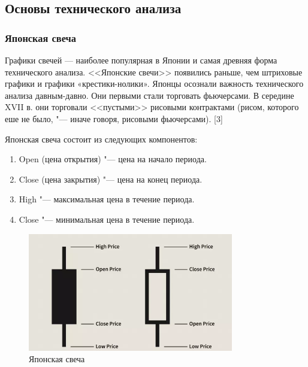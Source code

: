 \documentclass[bachelor, och, coursework]{SCWorks}
\begin{document}
        \subsection{Основы технического анализа}

            \subsubsection{Японская свеча}

            Графики свечей — наиболее популярная в Японии и самая древняя форма
            технического анализа. <<Японские свечи>> появились раньше, чем
            штриховые графики и графики «крестики-нолики». Японцы осознали
            важность технического анализа давным-давно. Они первыми стали
            торговать фьючерсами. В середине XVII в. они торговали <<пустыми>>
            рисовыми контрактами (рисом, которого еше не было, "--- иначе
            говоря, рисовыми фьючерсами). [3]

            Японская свеча состоит из следующих компонентов: 
            \begin{enumerate}
                \item Open (цена открытия) "--- цена на начало периода.
                \item Close (цена закрытия) "--- цена на конец периода.
                \item High "--- максимальная цена в течение периода.
                \item Close "--- минимальная цена в течение периода.
            \end{enumerate}

            \begin{figure}[H]
                \centering
                \includegraphics[width=0.8\textwidth]{pic/candlestick.png}
                \caption{Японская свеча}
            \end{figure}
\end{document}
